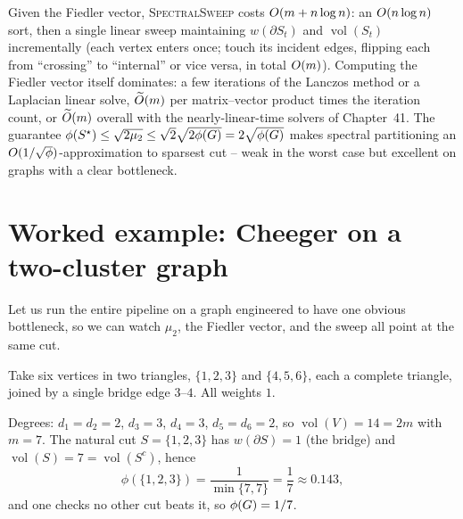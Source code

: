 \begin{complexitybox}
Given the Fiedler vector, \textsc{SpectralSweep} costs $O(m+n\log n)$: an $O(n\log n)$ sort, then a single linear sweep maintaining $w(\partial S_t)$ and $\operatorname{vol}(S_t)$ incrementally (each vertex enters once; touch its incident edges, flipping each from ``crossing'' to ``internal'' or vice versa, in total $O(m)$). Computing the Fiedler vector itself dominates: a few iterations of the Lanczos method or a Laplacian linear solve, $\widetilde{O}(m)$ per matrix--vector product times the iteration count, or $\widetilde{O}(m)$ overall with the nearly-linear-time solvers of Chapter~41. The guarantee $\phi(S^\star)\le\sqrt{2\mu_2}\le\sqrt{2}\sqrt{2\phi(G)}=2\sqrt{\phi(G)}$ makes spectral partitioning an $O(1/\sqrt{\phi})$-approximation to sparsest cut -- weak in the worst case but excellent on graphs with a clear bottleneck.
\end{complexitybox}

\section{Worked example: Cheeger on a two-cluster graph}
\label{ch32:worked-cheeger}

Let us run the entire pipeline on a graph engineered to have one obvious bottleneck, so we can watch $\mu_2$, the Fiedler vector, and the sweep all point at the same cut.

Take six vertices in two triangles, $\{1,2,3\}$ and $\{4,5,6\}$, each a complete triangle, joined by a single bridge edge $3$--$4$. All weights $1$.

\begin{center}
\end{center}

Degrees: $d_1=d_2=2$, $d_3=3$, $d_4=3$, $d_5=d_6=2$, so $\operatorname{vol}(V)=14=2m$ with $m=7$. The natural cut $S=\{1,2,3\}$ has $w(\partial S)=1$ (the bridge) and $\operatorname{vol}(S)=7=\operatorname{vol}(S^c)$, hence
\[
  \phi(\{1,2,3\}) = \frac{1}{\min\{7,7\}} = \frac{1}{7}\approx 0.143,
\]
and one checks no other cut beats it, so $\phi(G)=1/7$.

